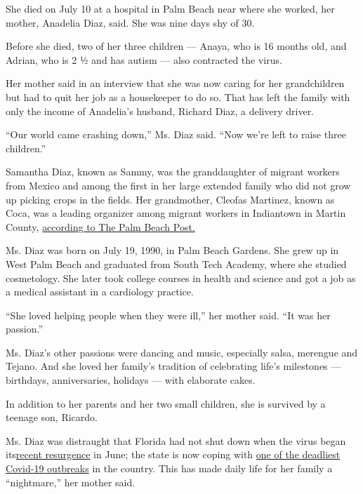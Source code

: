 She died on July 10 at a hospital in Palm Beach near where she worked,
her mother, Anadelia Diaz, said. She was nine days shy of 30.

Before she died, two of her three children --- Anaya, who is 16 months
old, and Adrian, who is 2 ½ and has autism --- also contracted the
virus.

Her mother said in an interview that she was now caring for her
grandchildren but had to quit her job as a housekeeper to do so. That
has left the family with only the income of Anadelia's husband, Richard
Diaz, a delivery driver.

``Our world came crashing down,'' Ms. Diaz said. ``Now we're left to
raise three children.''

Samantha Diaz, known as Sammy, was the granddaughter of migrant workers
from Mexico and among the first in her large extended family who did not
grow up picking crops in the fields. Her grandmother, Cleofas Martinez,
known as Coca, was a leading organizer among migrant workers in
Indiantown in Martin County,
\href{https://www.palmbeachpost.com/news/20200716/lost-to-coronavirus-29-year-old-working-american-dream}{according
to The Palm Beach Post.}

Ms. Diaz was born on July 19, 1990, in Palm Beach Gardens. She grew up
in West Palm Beach and graduated from South Tech Academy, where she
studied cosmetology. She later took college courses in health and
science and got a job as a medical assistant in a cardiology practice.

``She loved helping people when they were ill,'' her mother said. ``It
was her passion.''

Ms. Diaz's other passions were dancing and music, especially salsa,
merengue and Tejano. And she loved her family's tradition of celebrating
life's milestones --- birthdays, anniversaries, holidays --- with
elaborate cakes.

In addition to her parents and her two small children, she is survived
by a teenage son, Ricardo.

Ms. Diaz was distraught that Florida had not shut down when the virus
began
its\href{https://wptv.com/news/state/state-cases-surge-by-record-3-207-state-death-toll-up-43-including-6-in-palm-beach-county?fbclid=IwAR0647Jk_oGURUO3-FXAbJbOeZmbtKLdH6Bgq4rFaaDxih3tWvo-Ff1K82M}{recent
resurgence} in June; the state is now coping with
\href{https://www.nytimes.com/interactive/2020/us/florida-coronavirus-cases.html}{one
of the deadliest Covid-19 outbreaks} in the country. This has made daily
life for her family a ``nightmare,'' her mother said.

